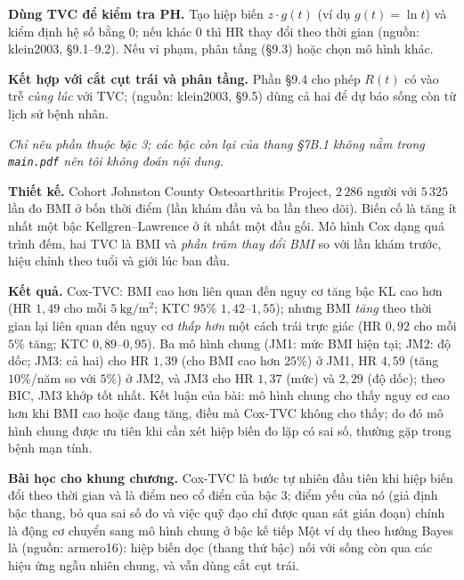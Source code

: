 \documentclass[11pt,a4paper,notitlepage]{report}
\providecommand{\nguon}[1]{(nguồn: #1)}
\begin{document}
\begin{bosung}
\textbf{Dùng TVC để kiểm tra PH.} Tạo hiệp biến $z\cdot g(t)$ (ví dụ $g(t)=\ln t$) và kiểm định hệ số bằng 0; nếu khác 0 thì HR thay đổi theo thời gian \nguon{klein2003, \S9.1--9.2}. Nếu vi phạm, phân tầng (\S9.3) hoặc chọn mô hình khác.

\textbf{Kết hợp với cắt cụt trái và phân tầng.} Phần \S9.4 cho phép $R(t)$ có vào trễ \emph{cùng lúc} với TVC; \nguon{klein2003, \S9.5} dùng cả hai để dự báo sống còn từ lịch sử bệnh nhân.
\end{bosung}

\begin{bosung}
\textit{Chỉ nêu phần thuộc bậc 3; các bậc còn lại của thang \S7B.1 không nằm trong \texttt{main.pdf} nên tôi không đoán nội dung.}

\textbf{Thiết kế.} Cohort Johnston County Osteoarthritis Project, $2\,286$ người với $5\,325$ lần đo BMI ở bốn thời điểm (lần khám đầu và ba lần theo dõi). Biến cố là tăng ít nhất một bậc Kellgren--Lawrence ở ít nhất một đầu gối.
Mô hình Cox dạng quá trình đếm, hai TVC là BMI và \emph{phần trăm thay đổi BMI} so với lần khám trước, hiệu chỉnh theo tuổi và giới lúc ban đầu.

\textbf{Kết quả.} Cox-TVC: BMI cao hơn liên quan đến nguy cơ tăng bậc KL cao hơn (HR $1{,}49$ cho mỗi $5\ \mathrm{kg/m^2}$; KTC $95\%$ $1{,}42$--$1{,}55$); nhưng BMI \emph{tăng} theo thời gian lại liên quan đến nguy cơ \emph{thấp hơn} một cách trái trực giác
(HR $0{,}92$ cho mỗi $5\%$ tăng; KTC $0{,}89$--$0{,}95$). Ba mô hình chung (JM1: mức BMI hiện tại; JM2: độ dốc; JM3: cả hai) cho HR $1{,}39$ (cho BMI cao hơn $25\%$) ở JM1, HR $4{,}59$ (tăng $10\%$/năm so với $5\%$) ở JM2,
và JM3 cho HR $1{,}37$ (mức) và $2{,}29$ (độ dốc); theo BIC, JM3 khớp tốt nhất. Kết luận của bài: mô hình chung cho thấy nguy cơ cao hơn khi BMI cao hoặc đang tăng, điều mà Cox-TVC không cho thấy; do đó mô hình chung được ưu tiên khi cần xét hiệp biến đo lặp có sai số, thường gặp trong bệnh mạn tính.

\textbf{Bài học cho khung chương.} Cox-TVC là bước tự nhiên đầu tiên khi hiệp biến đổi theo thời gian và là điểm neo cổ điển của bậc 3; điểm yếu của nó (giả định bậc thang, bỏ qua sai số đo và việc quỹ đạo chỉ được quan sát gián đoạn) chính là động cơ chuyển sang mô hình chung ở bậc kế tiếp
Một ví dụ theo hướng Bayes là \nguon{armero16}: hiệp biến dọc (thang thứ bậc) nối với sống còn qua các hiệu ứng ngẫu nhiên chung, và vẫn dùng cắt cụt trái.
\end{bosung}
\end{document}
